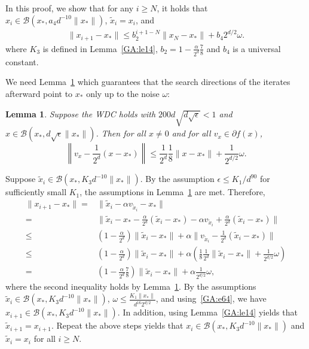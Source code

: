 \documentclass[11pt]{article}
\newtheorem{lemma}[theorem]{Lemma}
\begin{document}
In this proof, we show that for any $i \geq N$, it holds that $x_i \in \mathcal{B}(x_*, a_4 d^{-10} \|x_*\|)$, $\tilde{x}_i = x_i$, and
\begin{align*}
\|x_{i + 1} - x_*\| \leq b_2^{i + 1 - N} \|x_N - x_*\| + b_4 2^{d/2} \omega.
\end{align*}
where $K_3$ is defined in Lemma~\ref{GA:le14}, $b_2 = 1 - \frac{\alpha}{2^d} \frac{7}{8}$ and $b_4$ is a universal constant.

We need Lemma~\ref{GA:le10} which guarantees that the search directions of the iterates afterward point to $x_*$ only up to the noise $\omega$:
\begin{lemma} \label{GA:le10}
Suppose the WDC
holds with $200 d \sqrt{d \sqrt{\epsilon}} < 1$ and $x \in \mathcal{B}(x_*, d \sqrt{\epsilon} \|x_*\|)$.  Then
for all $x \neq 0$ and for all $v_x \in \partial f(x)$,
\begin{equation*}
\left\|v_x - \frac{1}{2^d} (x - x_*)\right\| \leq \frac{1}{2^d} \frac{1}{8} \|x - x_*\| + \frac{1}{2^{d/2}} \omega.
\end{equation*}%
\end{lemma}

Suppose $\tilde{x}_i \in \mathcal{B}(x_*, K_3 d^{-10} \|x_*\|)$. By the assumption $\epsilon \leq K_1 / d^{90}$ for sufficiently small $K_1$, the assumptions in Lemma~\ref{GA:le10} are met. Therefore,
\begin{align}
\|x_{i + 1} - x_*\|
=& \|\tilde{x}_i - \alpha {v}_{\tilde{x}_i} - x_*\|   \nonumber \\
=& \|\tilde{x}_i - x_*  -  \frac{\alpha}{2^d} (\tilde{x}_i - x_*) - \alpha {v}_{\tilde{x}_i} + \frac{\alpha}{2^d} (\tilde{x}_i - x_*) \| \nonumber \\
\leq& \left( 1 - \frac{\alpha}{2^d} \right) \|\tilde{x}_i - x_*\| + \alpha \|{v}_{\tilde{x}_i} - \frac{1}{2^d} (\tilde{x}_i - x_*)\| \nonumber \\
\leq& \left( 1 - \frac{\alpha}{2^d} \right) \|\tilde{x}_i - x_*\| + \alpha \left( \frac{1}{8} \frac{1}{2^d} \|\tilde{x}_i - x_*\| + \frac{1}{2^{d/2}} \omega \right) \nonumber \\
=& \left( 1 - \frac{\alpha}{2^d} \frac{7}{8} \right) \|\tilde{x}_i - x_*\| + \alpha \frac{1}{2^{d/2}} \omega, \label{GA:e64}
\end{align}
where the second inequality holds by Lemma~\ref{GA:le10}.
By the assumptions $\tilde{x}_i \in \mathcal{B}(x_*, K_3 d^{-10} \|x_*\|)$, $\omega \leq \frac{K_1 \|x_*\| }{d^{16} 2^{d/2} }$, and using~\eqref{GA:e64}, we have $x_{i + 1} \in \mathcal{B}(x_*, K_3 d^{-10} \|x_*\|)$. In addition, using Lemma~\ref{GA:le14} yields that $\tilde{x}_{i + 1} = x_{i+1}$. Repeat the above steps yields that $x_i \in \mathcal{B}(x_*, K_3 d^{-10} \|x_*\|)$ and $\tilde{x}_i = x_i$ for all $ i \geq N$.
\end{document}
